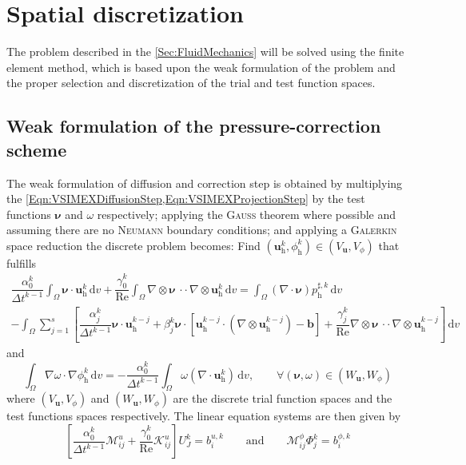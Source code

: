 \documentclass[]{scrartcl}
\renewcommand{\d}{\,\mathrm{d}}
\newcommand{\bs}[1]{\boldsymbol{#1}}
\newcommand{\cdott}{\, {\cdot}{\cdot}\,}
\begin{document}
\section{Spatial discretization}
The problem described in the \cref{Sec:FluidMechanics} will be solved using the finite element method, which is based upon the weak formulation of the problem and the proper selection and discretization of the trial and test function spaces.
\subsection{Weak formulation of the pressure-correction scheme}
The weak formulation of diffusion and correction step is obtained by multiplying the \cref{Eqn:VSIMEXDiffusionStep,Eqn:VSIMEXProjectionStep} by the test functions $\bs{\nu}$ and $\omega$ respectively; applying the \textsc{Gauss} theorem where possible and assuming there are no \textsc{Neumann} boundary conditions; and applying a \textsc{Galerkin} space reduction the discrete problem becomes: Find $(\bs{u}^k_\textrm{h}, \phi^k_\textrm{h}) \in (V_{\bs{u}}, V_\phi)$ that fulfills
\begin{equation*}
\begin{split}
\dfrac{\alpha_0^k}{\Delta t^{k-1}} 
\int_{\Omega}
\bs{\nu} \cdot \bs{u}^k_\textrm{h}
\d v 
+ 
\dfrac{\gamma_0^k}{\textrm{Re}}
\int_{\Omega} 
\nabla \otimes \bs{\nu} \cdott \nabla \otimes \bs{u}^k_\textrm{h}
\d v
=
\int_{\Omega}
(\nabla \cdot \bs{\nu}) p^{\sharp, k}_\textrm{h}
\d v \\
-
\int_{\Omega}
\sum_{j=1}^{s} 
\left[
\dfrac{\alpha_j^k}{\Delta t^{k-1}} \bs{\nu} \cdot \bs{u}^{k-j}_\textrm{h}
+
\beta_j^k \bs{\nu} \cdot \left[ \bs{u}^{k-j}_\textrm{h} \cdot (\nabla \otimes \bs{u}^{k-j}_\textrm{h} ) - \bs{b} \right]
+
\dfrac{\gamma_j^k}{\textrm{Re}} \nabla \otimes \bs{\nu} \cdott \nabla \otimes \bs{u}^{k-j}_\textrm{h}
\right]
\d v
\end{split} 	
\end{equation*}
and 
\begin{equation*}
	\int_{\Omega}
	\nabla \omega \cdot \nabla \phi^k_\textrm{h} 
	\d v
	= 
	- \dfrac{\alpha_0^k}{\Delta t^{k-1}} 
	\int_{\Omega}
	\omega (\nabla \cdot \bs{u}^k_\textrm{h})
	\d v,
	\qquad
	\forall (\bs{\nu}, \omega) \in (W_{\bs{u}}, W_\phi)
\end{equation*}
where $(V_{\bs{u}}, V_\phi)$ and $(W_{\bs{u}}, W_\phi)$ are the discrete trial function spaces and the test functions spaces respectively. The linear equation systems are then given by
\begin{equation*}
	\left[
	\dfrac{\alpha_0^k}{\Delta t^{k-1}} 
	\mathcal{M}^u_{ij}
	+
	\dfrac{\gamma_0^k}{\textrm{Re}}
	\mathcal{K}^u_{ij}
	\right]
	U^k_J
	= 
	b^{u, k}_i
	\qquad \textrm{and} \qquad
	\mathcal{M}^\phi_{ij} \Phi^k_j = b^{\phi, k}_i
\end{equation*}
\end{document}
